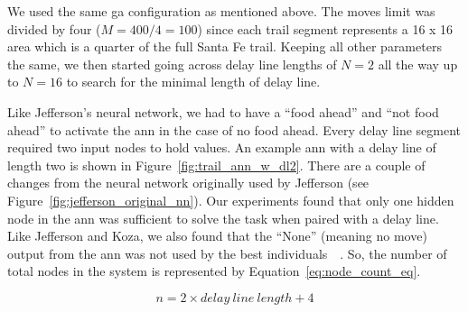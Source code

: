 We used the same \gls{ga} configuration as mentioned above. The moves limit was divided by four ($M = 400 / 4 = 100$) since each trail segment represents a 16 x 16 area which is a quarter of the full Santa Fe trail. Keeping all other parameters the same, we then started going across delay line lengths of $N=2$ all the way up to $N=16$ to search for the minimal length of delay line. 

Like Jefferson's neural network, we had to have a ``food ahead'' and ``not food ahead'' to activate the \gls{ann} in the case of no food ahead. Every delay line segment required two input nodes to hold values. An example \gls{ann} with a delay line of length two is shown in Figure~\ref{fig:trail_ann_w_dl2}. There are a couple of changes from the neural network originally used by Jefferson (see Figure~\ref{fig:jefferson_original_nn}). Our experiments found that only one hidden node in the \gls{ann} was sufficient to solve the task when paired with a delay line. Like Jefferson and Koza, we also found that the ``None'' (meaning no move) output from the \gls{ann} was not used by the best individuals~\cite{Jefferson1992-ph}~\cite{Koza1992-xs}. So, the number of total nodes in the system is represented by Equation~\ref{eq:node_count_eq}.

\begin{equation} \label{eq:node_count_eq}
n = 2 \times delay\:line\:length + 4
\end{equation}


